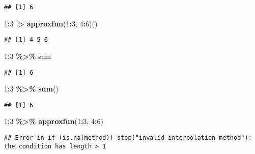 \documentclass[
]{article}
\newenvironment{Shaded}{\begin{snugshade}}{\end{snugshade}}
\newcommand{\DecValTok}[1]{\textcolor[rgb]{0.00,0.00,0.81}{#1}}
\newcommand{\FunctionTok}[1]{\textcolor[rgb]{0.13,0.29,0.53}{\textbf{#1}}}
\newcommand{\NormalTok}[1]{#1}
\newcommand{\SpecialCharTok}[1]{\textcolor[rgb]{0.81,0.36,0.00}{\textbf{#1}}}
\begin{document}
\begin{verbatim}
## [1] 6
\end{verbatim}

\begin{Shaded}
\begin{Highlighting}[]
\DecValTok{1}\SpecialCharTok{:}\DecValTok{3} \SpecialCharTok{|\textgreater{}} \FunctionTok{approxfun}\NormalTok{(}\DecValTok{1}\SpecialCharTok{:}\DecValTok{3}\NormalTok{, }\DecValTok{4}\SpecialCharTok{:}\DecValTok{6}\NormalTok{)()}
\end{Highlighting}
\end{Shaded}

\begin{verbatim}
## [1] 4 5 6
\end{verbatim}

\begin{Shaded}
\begin{Highlighting}[]
\DecValTok{1}\SpecialCharTok{:}\DecValTok{3} \SpecialCharTok{\%\textgreater{}\%}\NormalTok{ sum}
\end{Highlighting}
\end{Shaded}

\begin{verbatim}
## [1] 6
\end{verbatim}

\begin{Shaded}
\begin{Highlighting}[]
\DecValTok{1}\SpecialCharTok{:}\DecValTok{3} \SpecialCharTok{\%\textgreater{}\%} \FunctionTok{sum}\NormalTok{()}
\end{Highlighting}
\end{Shaded}

\begin{verbatim}
## [1] 6
\end{verbatim}

\begin{Shaded}
\begin{Highlighting}[]
\DecValTok{1}\SpecialCharTok{:}\DecValTok{3} \SpecialCharTok{\%\textgreater{}\%} \FunctionTok{approxfun}\NormalTok{(}\DecValTok{1}\SpecialCharTok{:}\DecValTok{3}\NormalTok{, }\DecValTok{4}\SpecialCharTok{:}\DecValTok{6}\NormalTok{) }
\end{Highlighting}
\end{Shaded}

\begin{verbatim}
## Error in if (is.na(method)) stop("invalid interpolation method"): the condition has length > 1
\end{verbatim}
\end{document}
